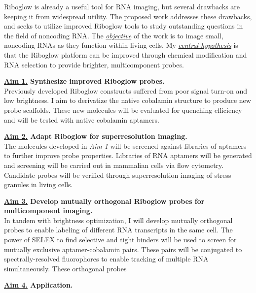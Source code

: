 Riboglow is already a useful tool for RNA imaging, but several drawbacks are keeping it from widespread utility. The proposed work addresses these drawbacks, and seeks to utilize improved Riboglow tools to study outstanding questions in the field of noncoding RNA. The \underline{\textit{objective}} of the work is to image small, noncoding RNAs as they function within living cells. My \underline{\textit{central hypothesis}} is that the Riboglow platform can be improved through chemical modification and RNA selection to provide brighter, multicomponent probes.

{\bf \underline{Aim 1.} Synthesize improved Riboglow probes.} \\
Previously developed Riboglow constructs suffered from poor signal turn-on and low brightness. I aim to derivatize the native cobalamin structure to produce new probe scaffolds. These new molecules will be evaluated for quenching efficiency and will be tested with native cobalamin aptamers.

{\bf \underline{Aim 2.} Adapt Riboglow for superresolution imaging.}\\
The molecules developed in \textit{Aim 1} will be screened against libraries of aptamers to further improve probe properties. Libraries of RNA aptamers will be generated and screening will be carried out in mammalian cells via flow cytometry. Candidate probes will be verified through superresolution imaging of stress granules in living cells.

{\bf \underline{Aim 3.} Develop mutually orthogonal Riboglow probes for multicomponent imaging.}\\
In tandem with brightness optimization, I will develop mutually orthogonal probes to enable labeling of different RNA transcripts in the same cell. The power of SELEX to find selective and tight binders will be used to screen for mutually exclusive aptamer-cobalamin pairs. These pairs will be conjugated to spectrally-resolved fluorophores to enable tracking of multiple RNA simultaneously. These orthogonal probes 

{\bf \underline{Aim 4.} Application.}\\

